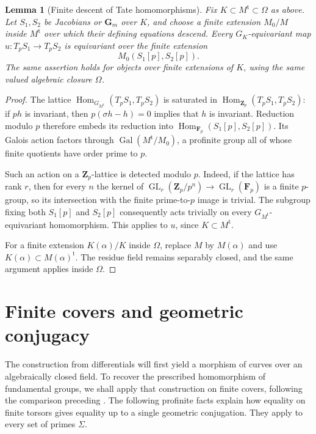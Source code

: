 \documentclass[11pt,a4paper]{article}
\numberwithin{equation}{section}
\theoremstyle{plain}
\newtheorem{lemma}[theorem]{Lemma}
\theoremstyle{definition}
\theoremstyle{remark}
\newcommand{\Zp}{\mathbf Z_p}
\newcommand{\Gm}{\mathbf G_m}
\newcommand{\tame}{\mathrm{t}}
\DeclareMathOperator{\Hom}{Hom}
\DeclareMathOperator{\Gal}{Gal}
\begin{document}
\begin{lemma}[Finite descent of Tate homomorphisms]
\label{lem:tate-descent}
Fix $K\subset M^{\tame}\subset\Omega$ as above. Let $S_1,S_2$ be
Jacobians or $\Gm$ over $K$, and choose a finite extension $M_0/M$ inside
$M^{\tame}$
over which their defining equations descend. Every $G_K$-equivariant map
$u:T_pS_1\to T_pS_2$ is equivariant over the finite extension
\[
                         M_0(S_1[p],S_2[p]).
\]
The same assertion holds for objects over finite extensions of $K$, using
the same valued algebraic closure $\Omega$.
\end{lemma}
\begin{proof}
The lattice $\Hom_{G_{M^{\tame}}}(T_pS_1,T_pS_2)$ is saturated in
$\Hom_{\Zp}(T_pS_1,T_pS_2)$: if $ph$ is invariant, then
$p(\sigma h-h)=0$ implies that $h$ is invariant. Reduction modulo $p$
therefore embeds its reduction into
$\Hom_{\mathbf F_p}(S_1[p],S_2[p])$. Its Galois action factors through
$\Gal(M^{\tame}/M_0)$, a profinite group all of whose finite quotients have
order prime to $p$.

Such an action on a $\Zp$-lattice is detected modulo $p$. Indeed, if the
lattice has rank $r$, then for every $n$ the kernel of
$\operatorname{GL}_r(\Zp/p^n)\to\operatorname{GL}_r(\mathbf F_p)$ is a
finite $p$-group, so its intersection with the finite prime-to-$p$ image
is trivial. The subgroup fixing both $S_1[p]$ and $S_2[p]$ consequently
acts trivially on every $G_{M^{\tame}}$-equivariant homomorphism.
This applies to $u$, since $K\subset M^{\tame}$.

For a finite extension $K(\alpha)/K$ inside $\Omega$, replace $M$ by
$M(\alpha)$ and use
$K(\alpha)\subset M(\alpha)^{\tame}$.
The residue field remains separably closed, and the same argument applies
inside $\Omega$.
\end{proof}

\section{Finite covers and geometric conjugacy}
\label{sec:covers}

The construction from differentials will first yield a morphism of curves
over an algebraically closed field. To recover the prescribed homomorphism
of fundamental groups, we shall apply that construction on finite covers,
following the comparison preceding \cite[Theorem~14.1]{Mochizuki1999}.
The following profinite facts explain how equality on finite torsors gives
equality up to a single geometric conjugation. They apply to every set of
primes $\Sigma$.
\end{document}
